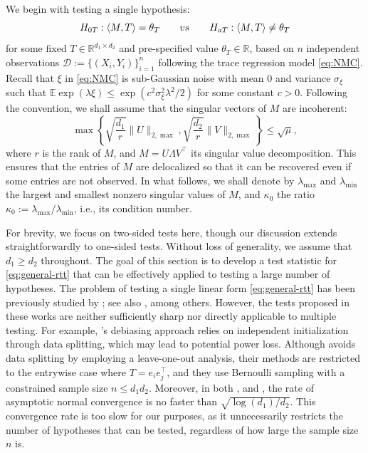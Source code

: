 \documentclass[12pt]{article}
\newcommand{\R}{\mathbb{R}}
\newcommand{\E}{\mathbb{E}}
\newcommand{\cD}{\mathcal{D}}
\theoremstyle{plain}
\begin{document}
\begin{sloppypar}
We begin with testing a single hypothesis:
\begin{equation}\label{eq:general-rtt}
	H_{0T}: \langle M, T\rangle =\theta_{T}\qquad {\rm vs}\qquad  H_{aT}: \langle M, T\rangle \neq \theta_{T}
\end{equation}
for some fixed $T\in\R^{d_1\times d_2}$ and pre-specified value $\theta_T\in \R$, based on $n$ independent observations $\cD:=\{(X_i,Y_i)\}_{i=1}^n$ following the trace regression model \eqref{eq:NMC}. Recall that $\xi$ in \eqref{eq:NMC} is sub-Gaussian noise with mean $0$ and variance $\sigma_\xi$ such that $\E \exp{(\lambda \xi)}\le \exp{(c^2 \sigma_\xi^2\lambda^2 /2 )}$ for some constant $c>0$. Following the convention, we shall assume that the singular vectors of $M$ are incoherent:
\begin{equation}\label{eq:incoherence}
	\max \left\{\sqrt{\frac{d_1}{r}}\|U\|_{2, \max }, \sqrt{\frac{d_2}{r}}\|V\|_{2, \max }\right\} \leq \sqrt{\mu},
\end{equation}
where $r$ is the rank of $M$, and $M=U\Lambda V^\top$ its singular value decomposition. This ensures that the entries of $M$ are delocalized so that it can be recovered even if some entries are not observed. In what follows, we shall denote by $\lambda_{\max}$ and $\lambda_{\min}$ the largest and smallest nonzero singular values of $M$, and $\kappa_0$ the ratio $\kappa_0:=\lambda_{\max}/\lambda_{\min}$, i.e., its condition number.

{

For brevity, we focus on two-sided tests here, though our discussion extends straightforwardly to one-sided tests. Without loss of generality, we assume that $d_1 \ge d_2$ throughout. The goal of this section is to develop a test statistic for \eqref{eq:general-rtt} that can be effectively applied to testing a large number of hypotheses. The problem of testing a single linear form \eqref{eq:general-rtt} has been previously studied by \cite{xia2021statistical}; see also \cite{chen2019inference, farias2022uncertainty, chen2023statistical}, among others. However, the tests proposed in these works are neither sufficiently sharp nor directly applicable to multiple testing. For example, \citet{xia2021statistical}'s debiasing approach relies on independent initialization through data splitting, which may lead to potential power loss. Although \citet{chen2019inference,farias2022uncertainty} avoids data splitting by employing a leave-one-out analysis, their methods are restricted to the entrywise case where $T = e_i e_j^\top$, and they use Bernoulli sampling with a constrained sample size $n\le d_1 d_2$. Moreover, in both \citet{xia2021statistical}, and \citet{chen2019inference,farias2022uncertainty}, the rate of asymptotic normal convergence is no faster than $\sqrt{\log(d_1)/d_2}$. This convergence rate is too slow for our purposes, as it unnecessarily restricts the number of hypotheses that can be tested, regardless of how large the sample size $n$ is.

}
\end{sloppypar}
\end{document}
